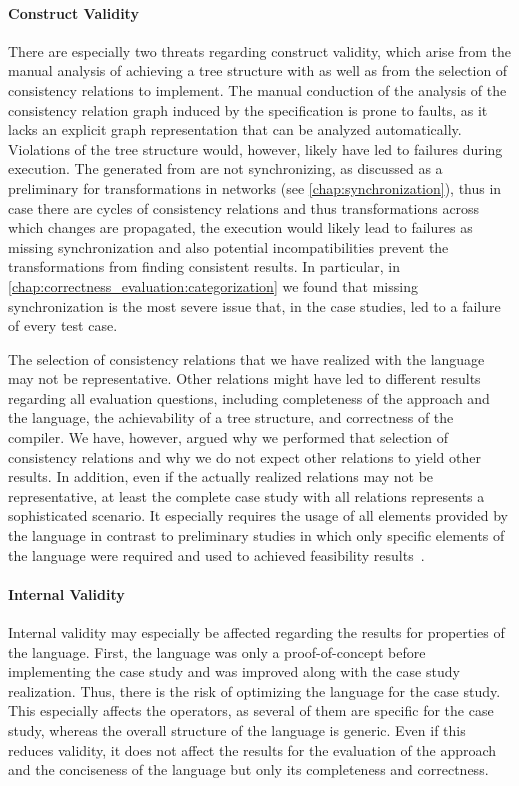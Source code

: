 \paragraph{Construct Validity}
There are especially two threats regarding construct validity, which arise from the manual analysis of achieving a tree structure with \commonalities as well as from the selection of consistency relations to implement.
The manual conduction of the analysis of the consistency relation graph induced by the \commonalities specification is prone to faults, as it lacks an explicit graph representation that can be analyzed automatically.
Violations of the tree structure would, however, likely have led to failures during execution.
The \reactions generated from \commonalities are not synchronizing, as discussed as a preliminary for transformations in networks (see \autoref{chap:synchronization}), thus in case there are cycles of consistency relations and thus transformations across which changes are propagated, the execution would likely lead to failures as missing synchronization and also potential incompatibilities prevent the transformations from finding consistent results.
In particular, in \autoref{chap:correctness_evaluation:categorization} we found that missing synchronization is the most severe issue that, in the case studies, led to a failure of every test case.

The selection of consistency relations that we have realized with the \commonalities language may not be representative.
Other relations might have led to different results regarding all evaluation questions, including completeness of the approach and the language, the achievability of a tree structure, and correctness of the compiler.
We have, however, argued why we performed that selection of consistency relations and why we do not expect other relations to yield other results.
In addition, even if the actually realized relations may not be representative, at least the complete case study with all relations represents a sophisticated scenario.
It especially requires the usage of all elements provided by the \commonalities language in contrast to preliminary studies in which only specific elements of the language were required and used to achieved feasibility results~.

\paragraph{Internal Validity}
Internal validity may especially be affected regarding the results for properties of the \commonalities language.
First, the language was only a proof-of-concept before implementing the case study and was improved along with the case study realization.
Thus, there is the risk of optimizing the language for the case study.
This especially affects the operators, as several of them are specific for the case study, whereas the overall structure of the language is generic.
Even if this reduces validity, it does not affect the results for the evaluation of the \commonalities approach and the conciseness of the language but only its completeness and correctness.

